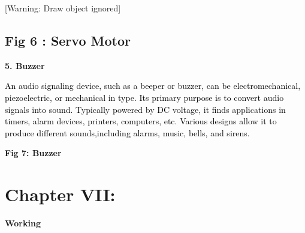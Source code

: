 \documentclass[letterpaper]{article}
\begin{document}
\clearpage\setcounter{page}{1}\pagestyle{Convertedxvii}
[Warning: Draw object ignored]


\bigskip


\bigskip


\bigskip


\bigskip


\bigskip

\subsection{Fig 6 : Servo Motor}

\bigskip

\textbf{5. Buzzer}

\textcolor{black}{An audio signaling device, such as a beeper or buzzer, can be electromechanical, piezoelectric, or
mechanical in type. Its primary purpose is to convert audio signals into sound. Typically powered by DC voltage, it
finds applications in timers, alarm devices, printers, computers, etc. Various designs allow it to produce different
sounds,including alarms, music, bells, and sirens.}


\bigskip


\bigskip


\bigskip


\bigskip


\bigskip


\bigskip


\bigskip


\bigskip


\bigskip

{\centering
\textbf{Fig 7: Buzzer}
\par}

\clearpage\setcounter{page}{1}\pagestyle{Convertedxviii}
\section[Chapter VII:]{Chapter VII:}

\bigskip

{\centering
\textbf{Working}
\par}


\bigskip
\end{document}
